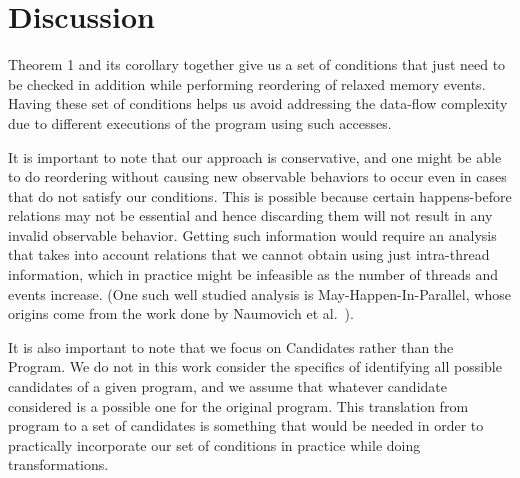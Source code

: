 \section{Discussion} 

    
    Theorem 1 and its corollary together give us a set of conditions that just need to be checked in addition while performing reordering of relaxed memory events. Having these set of conditions helps us avoid addressing the data-flow complexity due to different executions of the program using such accesses.    

    It is important to note that our approach is conservative, and one might be able to do reordering without causing new observable behaviors to occur even in cases that do not satisfy our conditions. 
    This is possible because certain happens-before relations may not be essential and hence discarding them will not result in any invalid observable behavior.
    Getting such information would require an analysis that takes into account relations that we cannot obtain using just intra-thread information, which in practice might be infeasible as the number of threads and events increase. (One such well studied analysis is May-Happen-In-Parallel, whose origins come from the work done by Naumovich et al.~\cite{NaumovichA}).
    
    It is also important to note that we focus on Candidates rather than the Program. We do not in this
    work consider the specifics of identifying all possible candidates of a given program, and we assume that whatever candidate considered is a possible one for the original program. 
    This translation from program to a set of candidates is something that would be needed in order to practically incorporate our set of conditions in practice while doing transformations.
    
